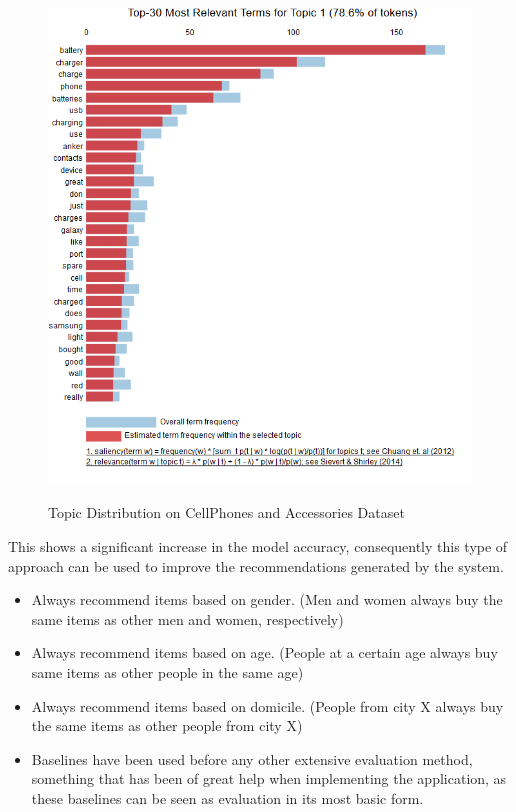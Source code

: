 \begin{figure}[H]
  {\includegraphics[width = 0.85 \textwidth]{img/lda/3a.PNG}}
  \caption{Topic Distribution on CellPhones and Accessories Dataset}
\end{figure}



This shows a significant increase in the model accuracy, consequently this type of approach can be used to improve the recommendations generated by the system.

\begin{itemize}
    \item Always recommend items based on gender. (Men and women always buy the same items as other men and women, respectively)
    \item Always recommend items based on age. (People at a certain age always buy same items as other people in the same age)
    \item Always recommend items based on domicile. (People from city X always buy the same items as other people from city X)
    \item Baselines have been used before any other extensive evaluation method, something that has been of great help when implementing the application, as these baselines can be seen as evaluation in its most basic form.
\end{itemize}


